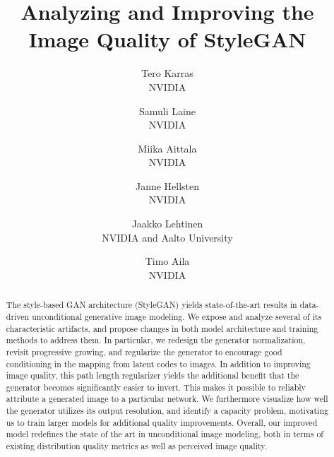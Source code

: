 \documentclass[10pt,twocolumn,letterpaper]{article}
\newif\ifforceplain\forceplainfalse
\newif\ifarxiv
\newcommand{\FINAL}[2][]{#2}
\begin{document}
\title{Analyzing and Improving the Image Quality of StyleGAN}

\author{Tero Karras\\
NVIDIA\and
Samuli Laine\\
NVIDIA\and
Miika Aittala\\
NVIDIA\and
Janne Hellsten\\
NVIDIA\and
Jaakko Lehtinen\\
NVIDIA and Aalto University\and
Timo Aila\\
NVIDIA}

\maketitle

\ifcvprfinal\thispagestyle{empty}\fi
\ifarxiv
\pagestyle{plain}\thispagestyle{plain}
\fi

\ifforceplain\thispagestyle{plain}\pagestyle{plain}\fi

\ifarxiv
	\newcommand{\refappimagequality}{Appendix~\ref{app:imagequality}}
	\newcommand{\refappimplementation}{Appendix~\ref{app:implementation}}
	\newcommand{\refappregularization}{Appendix~\ref{app:regularization}}
	\newcommand{\refappprojectiondetails}{Appendix~\ref{app:projectiondetails}}
	\newcommand{\refapplsuncomparison}{Figures~\ref{fig:catscomparison} and~\ref{fig:carscomparison}}
	\newcommand{\refappspectralnorm}{Appendix~\ref{app:spectralnorm}}
	\newcommand{\refapppower}{Appendix~\ref{app:power}}
\else
	\newcommand{\refappimagequality}{Appendix~A}
	\newcommand{\refappimplementation}{Appendix~B}
	\newcommand{\refappregularization}{Appendix~C}
	\newcommand{\refappprojectiondetails}{Appendix~D}
	\newcommand{\refapplsuncomparison}{Figures~3 and 4 in the Supplement}
	\newcommand{\refappspectralnorm}{Appendix~E}
	\newcommand{\refapppower}{Appendix~F}
\fi
\newcommand{\reftablsun}{Table~\ref{tab:lsun}}

\begin{abstract}

The style-based GAN architecture (StyleGAN) yields state-of-the-art results in data-driven unconditional generative image modeling. 
We expose and analyze several of its characteristic artifacts, and propose changes in both model architecture and training methods to address them.
In particular, we redesign the generator normalization, revisit progressive growing, and regularize the generator to encourage good conditioning in the mapping from latent codes to images. 
In addition to improving image quality, this path length regularizer yields the additional benefit that the generator becomes significantly easier to invert.
\FINAL{This makes it possible to reliably attribute a generated image to a particular network.} 
We furthermore visualize how well the generator utilizes its output resolution, and identify a capacity problem, motivating us to train larger models for additional quality improvements. 
Overall, our improved model redefines the state of the art in unconditional image modeling, both in terms of existing distribution quality metrics as well as perceived image quality.

\end{abstract}
\end{document}
